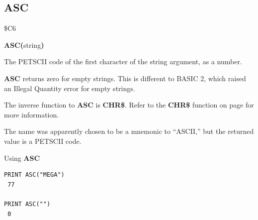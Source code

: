 
\newpage
\subsection{ASC}
\begin{description}[leftmargin=2cm,style=nextline]
\item [Token:]    \$C6

\item [Format:]   {\bf ASC(}string{\bf)}

\item [Returns:]  The PETSCII code of the first character of the string argument, as a number.

\item [Remarks:]  {\bf ASC} returns zero for empty strings. This is different to BASIC 2, which raised an Illegal Quantity error for empty strings.

                  The inverse function to {\bf ASC} is {\bf CHR\$}. Refer to the {\bf CHR\$} function on page \pageref{BASIC 65 Functions!CHR} for more information.

                  The name was apparently chosen to be a mnemonic to ``ASCII,'' but the returned value is a PETSCII code.

\item [Examples:] Using {\bf ASC}

\begin{tcolorbox}[colback=black,coltext=white]
\verbatimfont{\codefont}
\begin{verbatim}
PRINT ASC("MEGA")
 77

PRINT ASC("")
 0
\end{verbatim}
\end{tcolorbox}
\end{description}


\newpage
